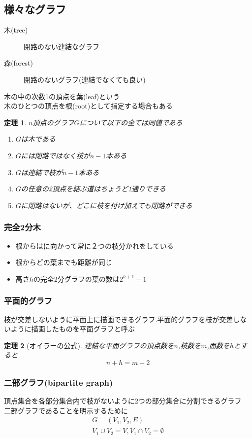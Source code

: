 \documentclass[a4j,10.5pt]{jarticle}
\theoremstyle{break}
\newtheorem{theo}{定理}[section]
\begin{document}
\subsection{様々なグラフ}
\begin{description}
\item[木(tree)] 閉路のない連結なグラフ
\item[森(forest)] 閉路のないグラフ(連結でなくても良い)
\end{description}
木の中の次数1の頂点を葉(leaf)という\\
木のひとつの頂点を根(root)として指定する場合もある

\begin{theo}
$n$頂点のグラフ$G$について以下の全ては同値である
\begin{enumerate}
\item $G$は木である
\item $G$には閉路ではなく枝が$n-1$本ある
\item $G$は連結で枝が$n-1$本ある
\item $G$の任意の2頂点を結ぶ道はちょうど1通りできる
\item $G$に閉路はないが、どこに枝を付け加えても閉路ができる
\end{enumerate}
\end{theo}

\subsubsection*{完全2分木}
\begin{itemize}
\item 根からはに向かって常に２つの枝分かれをしている
\item 根からどの葉までも距離が同じ
\item 高さ$h$の完全2分グラフの葉の数は$2^{h + 1} - 1$
\end{itemize}

\subsubsection*{平面的グラフ}
枝が交差しないように平面上に描画できるグラフ.平面的グラフを枝が交差しないように描画したものを平面グラフと呼ぶ

\begin{theo}[オイラーの公式]
連結な平面グラフの頂点数を$n$,枝数を$m$,面数を$h$とすると
\[n + h = m + 2\]
\end{theo}

\subsubsection*{二部グラフ(bipartite graph)}
頂点集合を各部分集合内で枝がないように2つの部分集合に分割できるグラフ\\
二部グラフであることを明示するために
\begin{eqnarray*}
G = (V_1,V_2,E)\\
V_1 \cup V_2 = V, V_1 \cap V_2 = \emptyset
\end{eqnarray*}
\end{document}
